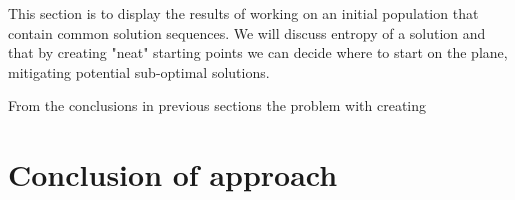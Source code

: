             This section is to display the results of working on an initial population that contain common solution sequences. We will discuss entropy of a solution and that by creating "neat" starting points we can decide where to start on the plane, mitigating potential sub-optimal solutions.

            From the conclusions in previous sections the problem with creating 

            \section{Conclusion of approach}